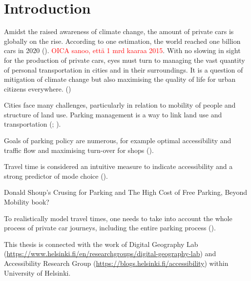 \section{Introduction}
\justify


Amidst the raised awareness of climate change, the amount of private cars is globally on the rise. According to one estimation, the world reached one billion cars in 2020 (\cite{Sperling2009}). \textcolor{red}{OICA sanoo, että 1 mrd kaaraa 2015}. With no slowing in sight for the production of private cars, eyes must turn to managing the vast quantity of personal transportation in cities and in their surroundings. It is a question of mitigation of climate change but also maximising the quality of life for urban citizens everywhere. (\cite{StatisticsFinland2019})

Cities face many challenges, particularly in relation to mobility of people and structure of land use. Parking management is a way to link land use and transportation (\cite{Marsden2006}; \cite{Diallo2015}).

Goals of parking policy are numerous, for example optimal accessibility and traffic flow and maximising turn-over for shops (\cite{Marsden2006}).

Travel time is considered an intuitive measure to indicate accessibility and a strong predictor of mode choice (\cite{Frank2008}).

Donald Shoup's Crusing for Parking and The High Cost of Free Parking, Beyond Mobility book?

To realistically model travel times, one needs to take into account the whole process of private car journeys, including the entire parking process (\cite{Salonen2013}).

This thesis is connected with the work of Digital Geography Lab (\textcolor{blue}{\url{https://www.helsinki.fi/en/researchgroups/digital-geography-lab}}) and Accessibility Research Group (\textcolor{blue}{\url{https://blogs.helsinki.fi/accessibility}}) within University of Helsinki.

